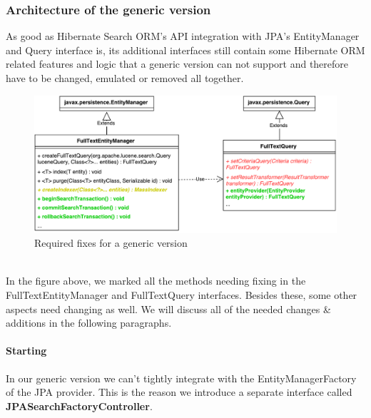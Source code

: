 \pagebreak

\subsubsection{Architecture of the generic version}

As good as Hibernate Search ORM's API integration with JPA's EntityManager and Query interface is, its additional interfaces still contain some Hibernate ORM related features and logic that a generic version can not support and therefore have to be changed, emulated or removed all together.
\\
\begin{figure}[ht]
	\centering
	\includegraphics[scale=0.6]{images/hibernate_search_jpa_integration_with_differences.pdf}
	\caption{Required fixes for a generic version}
	\label{hibernate_search_jpa_integration_with_differences}
\end{figure}
\\
In the figure above, we marked all the methods needing fixing in the FullTextEntityManager and FullTextQuery interfaces. Besides these, some other aspects need changing as well. We will discuss all of the needed changes \& additions in the following paragraphs.

\paragraph{Starting}

In our generic version we can't tightly integrate with the EntityManagerFactory of the JPA provider. This is the reason we introduce a separate interface called \textbf{JPASearchFactoryController}.

